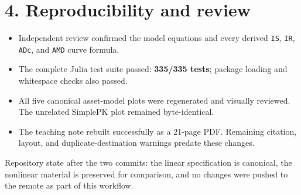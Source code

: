 \documentclass[10pt,a4paper]{article}
\begin{document}
\section*{4. Reproducibility and review}

\begin{itemize}
  \item Independent review confirmed the model equations and every derived
    \texttt{IS}, \texttt{IR}, \texttt{ADc}, and \texttt{AMD} curve formula.
  \item The complete Julia test suite passed: \textbf{335/335 tests}; package
    loading and whitespace checks also passed.
  \item All five canonical asset-model plots were regenerated and visually
    reviewed. The unrelated SimplePK plot remained byte-identical.
  \item The teaching note rebuilt successfully as a 21-page PDF. Remaining
    citation, layout, and duplicate-destination warnings predate these changes.
\end{itemize}

\vfill
{\footnotesize\color{accent}
Repository state after the two commits: the linear specification is canonical,
the nonlinear material is preserved for comparison, and no changes were pushed
to the remote as part of this workflow.}
\end{document}

